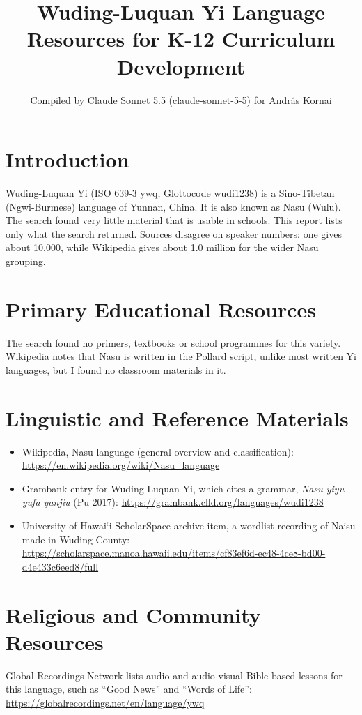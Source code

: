 \documentclass[12pt]{article}
\title{Wuding-Luquan Yi Language Resources for K-12 Curriculum Development}
\author{Compiled by Claude Sonnet 5.5 (claude-sonnet-5-5) for Andr\'as Kornai}
\date{}
\begin{document}
\maketitle

\section{Introduction}
Wuding-Luquan Yi (ISO 639-3 ywq, Glottocode wudi1238) is a Sino-Tibetan (Ngwi-Burmese) language of Yunnan, China. It is also known as Nasu (Wulu). The search found very little material that is usable in schools. This report lists only what the search returned. Sources disagree on speaker numbers: one gives about 10,000, while Wikipedia gives about 1.0 million for the wider Nasu grouping.

\section{Primary Educational Resources}
The search found no primers, textbooks or school programmes for this variety. Wikipedia notes that Nasu is written in the Pollard script, unlike most written Yi languages, but I found no classroom materials in it.

\section{Linguistic and Reference Materials}
\begin{itemize}
\item Wikipedia, Nasu language (general overview and classification): \url{https://en.wikipedia.org/wiki/Nasu_language}
\item Grambank entry for Wuding-Luquan Yi, which cites a grammar, \emph{Nasu yiyu yufa yanjiu} (Pu 2017): \url{https://grambank.clld.org/languages/wudi1238}
\item University of Hawai\textquoteleft i ScholarSpace archive item, a wordlist recording of Naisu made in Wuding County: \url{https://scholarspace.manoa.hawaii.edu/items/cf83ef6d-ec48-4ce8-bd00-d4e433c6eed8/full}
\end{itemize}

\section{Religious and Community Resources}
Global Recordings Network lists audio and audio-visual Bible-based lessons for this language, such as ``Good News'' and ``Words of Life'': \url{https://globalrecordings.net/en/language/ywq}
\end{document}
